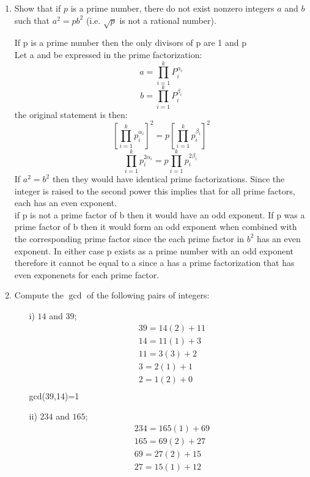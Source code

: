 \documentclass[11pt]{article}
\theoremstyle{definition}  %
\begin{document}
\begin{enumerate}
\begin{proof}
\begin{align*}
  &\text{ Which implies }\\
  &(1 + x)^n-1\geq nx
\end{align*}
\end{proof}
\item Show that if $p$ is a prime number, there do not exist nonzero integers $a$ and $b$ such that $a^2 = pb^2$ (i.e. $\sqrt{p}$ is not a rational number).\\
\begin{Proof} If p is a prime number then the only divisors of p are 1 and p\\
Let a and be expressed in the prime factorization:
\[
  a=\prod_{i=1}^kP_i^{\alpha_i}
\]
\[
  b=\prod_{i=1}^kP_i^{\beta_i}
\]
the original statement is then:
\[
  \left[\prod_{i=1}^kp_i^{\alpha_i}\right]^2=p\left[\prod_{i=1}^kp_i^{\beta_i}\right]^2
\]
\[
  \prod_{i=1}^kp_i^{2\alpha_i}=p\prod_{i=1}^kp_i^{2\beta_i}\
\]
If $a^2=b^2$ then they would have identical prime factorizations. Since the integer is raised to the second power this implies that for all prime factors, each has an even exponent. \\
if p is not a prime factor of b then it would have an odd exponent. If p was a prime factor of b then it would form an odd exponent when combined with the corresponding prime factor since the each prime factor in $b^2$ has an even exponent.  In either case p exists as a prime number with an odd exponent therefore it cannot be equal to a since a has a prime factorization that has even exponenets for each prime factor.
\end{Proof}
\item Compute the $\gcd$ of the following pairs of integers:
  \begin{itemize}
  \item[i)] $14$ and $39$;
  \begin{align*}
    &39=14(2)+11\\
    &14=11(1)+3\\
    &11=3(3)+2\\
    &3=2(1)+1\\
    &2=1(2)+0\\
  \end{align*}
    gcd(39,14)=1
  \item[ii)] $234$ and $165$;
  \begin{align*}
  &234=165(1)+69\\
  &165=69(2)+27\\
  &69=27(2)+15\\
  &27=15(1)+12\\

\end{align*}
\end{itemize}
\end{enumerate}
\end{document}
